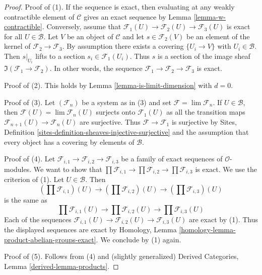 \begin{proof}
Proof of (1). If the sequence is exact, then evaluating at any
weakly contractible element of $\mathcal{C}$ gives an exact
sequence by Lemma \ref{lemma-w-contractible}. Conversely, assume that
$\mathcal{F}_1(U) \to \mathcal{F}_2(U) \to \mathcal{F}_3(U)$
is exact for all $U \in \mathcal{B}$.
Let $V$ be an object of $\mathcal{C}$ and let
$s \in \mathcal{F}_2(V)$ be an element of the kernel of
$\mathcal{F}_2 \to \mathcal{F}_3$. By assumption there exists
a covering $\{U_i \to V\}$ with $U_i \in \mathcal{B}$.
Then $s|_{U_i}$ lifts to a section $s_i \in \mathcal{F}_1(U_i)$.
Thus $s$ is a section of the image sheaf
$\Im(\mathcal{F}_1 \to \mathcal{F}_2)$.
In other words, the sequence
$\mathcal{F}_1 \to \mathcal{F}_2 \to \mathcal{F}_3$
is exact.

\medskip\noindent
Proof of (2). This holds by Lemma \ref{lemma-is-limit-dimension} with $d = 0$.

\medskip\noindent
Proof of (3). Let $(\mathcal{F}_n)$ be a system as in (3) and set
$\mathcal{F} = \lim \mathcal{F}_n$. If $U \in \mathcal{B}$, then
$\mathcal{F}(U) = \lim \mathcal{F}_n(U)$
surjects onto $\mathcal{F}_1(U)$ as all the transition maps
$\mathcal{F}_{n + 1}(U) \to \mathcal{F}_n(U)$ are surjective.
Thus $\mathcal{F} \to \mathcal{F}_1$ is surjective by
Sites, Definition \ref{sites-definition-sheaves-injective-surjective}
and the assumption that every object
has a covering by elements of $\mathcal{B}$.

\medskip\noindent
Proof of (4). Let
$\mathcal{F}_{i, 1} \to \mathcal{F}_{i, 2} \to \mathcal{F}_{i, 3}$
be a family of exact sequences of $\mathcal{O}$-modules.
We want to show that
$\prod \mathcal{F}_{i, 1} \to \prod \mathcal{F}_{i, 2} \to
\prod \mathcal{F}_{i, 3}$ is exact. We use the criterion of (1).
Let $U \in \mathcal{B}$. Then
$$
(\prod \mathcal{F}_{i, 1})(U) \to
(\prod \mathcal{F}_{i, 2})(U) \to
(\prod \mathcal{F}_{i, 3})(U)
$$
is the same as
$$
\prod \mathcal{F}_{i, 1}(U) \to
\prod \mathcal{F}_{i, 2}(U) \to
\prod \mathcal{F}_{i, 3}(U)
$$
Each of the sequences
$\mathcal{F}_{i, 1}(U) \to \mathcal{F}_{i, 2}(U) \to \mathcal{F}_{i, 3}(U)$
are exact by (1). Thus the displayed sequences are exact by
Homology, Lemma \ref{homology-lemma-product-abelian-groups-exact}.
We conclude by (1) again.

\medskip\noindent
Proof of (5). Follows from (4) and (slightly generalized)
Derived Categories, Lemma \ref{derived-lemma-products}.


\end{proof}
